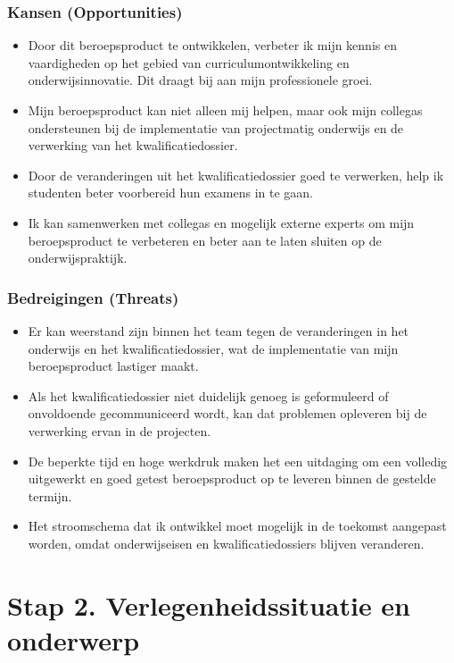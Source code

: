 \subsubsection{Kansen (Opportunities)}
\begin{itemize}
    \item Door dit beroepsproduct te ontwikkelen, verbeter ik mijn kennis en vaardigheden op het gebied van curriculumontwikkeling en onderwijsinnovatie. Dit draagt bij aan mijn professionele groei.
    \item Mijn beroepsproduct kan niet alleen mij helpen, maar ook mijn collega\textquotesingle s
 ondersteunen bij de implementatie van projectmatig onderwijs en de verwerking van het kwalificatiedossier.
    \item Door de veranderingen uit het kwalificatiedossier goed te verwerken, help ik studenten beter voorbereid hun examens in te gaan.
    \item Ik kan samenwerken met collega\textquotesingle s
 en mogelijk externe experts om mijn beroepsproduct te verbeteren en beter aan te laten sluiten op de onderwijspraktijk.
\end{itemize}


\subsubsection{Bedreigingen (Threats)}
\begin{itemize}
    \item Er kan weerstand zijn binnen het team tegen de veranderingen in het onderwijs en het kwalificatiedossier, wat de implementatie van mijn beroepsproduct lastiger maakt.
    \item Als het kwalificatiedossier niet duidelijk genoeg is geformuleerd of onvoldoende gecommuniceerd wordt, kan dat problemen opleveren bij de verwerking ervan in de projecten.
    \item De beperkte tijd en hoge werkdruk maken het een uitdaging om een volledig uitgewerkt en goed getest beroepsproduct op te leveren binnen de gestelde termijn.
    \item Het stroomschema dat ik ontwikkel moet mogelijk in de toekomst aangepast worden, omdat onderwijseisen en kwalificatiedossiers blijven veranderen.
\end{itemize}

\section{Stap 2. Verlegenheidssituatie en onderwerp}


